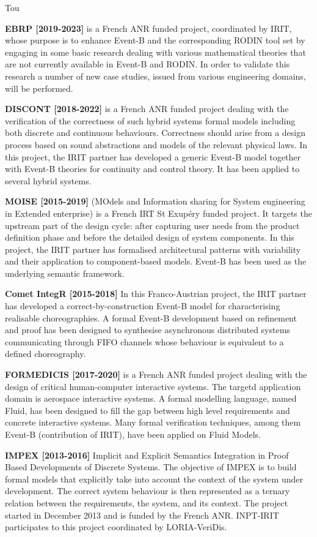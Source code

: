 \begin{sitedescription}{Tou}
\begin{compactitem}
 \item  \textbf{EBRP [2019-2023]} is a French ANR funded project, coordinated by IRIT,  whose purpose  is to enhance Event-B and the corresponding RODIN tool set by engaging in some basic research dealing with various mathematical theories that are not currently available in Event-B and RODIN. In order to validate this research a number of new case studies, issued from various engineering domains, will be performed. 
\item  \textbf{DISCONT [2018-2022]}  is a French ANR funded project dealing  with the verification of the correctness of such hybrid systems formal models including both discrete and continuous behaviours.  Correctness should arise from a design process based on sound abstractions and models of the relevant physical laws. In this project, the IRIT partner has developed a generic Event-B model together with Event-B theories for continuity and control theory. It has been applied to several hybrid systems. 
\item \textbf{MOISE [2015-2019]} (MOdels and Information sharing for System engineering in Extended enterprise) is a French IRT St Exupéry funded project. It targets the upstream part of the design cycle: after capturing user needs from the product definition phase and before the detailed design of system components. In this project, the IRIT partner has
formalised architectural patterns with variability and their
application to component-based models. Event-B has been used as the underlying semantic framework.
\item \textbf{Comet IntegR [2015-2018]} In this Franco-Austrian project, the IRIT partner has developed a correct-by-construction Event-B model for characterising realisable choreographies. A formal Event-B development based on refinement and proof has been designed to synthesise asynchronous distributed systems communicating through FIFO channels whose behaviour is equivalent to a defined choreography. 
 \item  \textbf{FORMEDICIS [2017-2020]}  is a French ANR funded project dealing with the design of critical human-computer interactive systems. The targetd application domain is aerospace interactive systems. A formal modelling language, named Fluid, has been designed to fill the gap between high level requirements and concrete interactive systems. Many formal verification techniques, among them Event-B (contribution of IRIT), have been applied on Fluid Models. 
\item \textbf{IMPEX [2013-2016]} Implicit and Explicit Semantics Integration in Proof Based Developments of Discrete Systems. 
The objective of IMPEX is to build formal models that explicitly take into account the context of the system under development. The correct system behaviour is then represented as a ternary relation between the requirements, the system, and its context. The project started in December 2013 and is funded by the French ANR.  INPT-IRIT participates to this project coordinated by LORIA-VeriDis.
 \end{compactitem}


\end{sitedescription}
